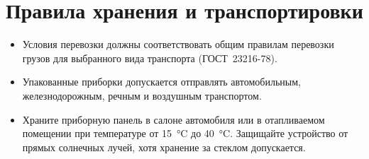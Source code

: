 \chapter{Правила хранения и транспортировки}\label{ch:storage-ru}

\begin{itemize}
    \item Условия перевозки должны соответствовать общим правилам перевозки грузов для выбранного вида транспорта (ГОСТ~23216-78).
    \item Упакованные приборки допускается отправлять автомобильным, железнодорожным, речным и воздушным транспортом.
    \item Храните приборную панель в салоне автомобиля или в отапливаемом помещении при температуре от \SI{15}{\celsius} до \SI{40}{\celsius}. Защищайте устройство от прямых солнечных лучей, хотя хранение за стеклом допускается.
\end{itemize}
